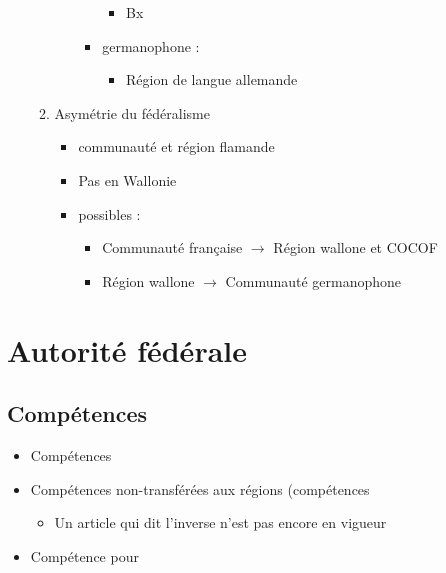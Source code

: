 \begin{itemize}
\begin{enumerate}
\begin{itemize}
\begin{itemize}
\begin{itemize}
					\item Bx
				\end{itemize}
				\item germanophone :
				\begin{itemize}
					\item Région de langue allemande
				\end{itemize}
			\end{itemize}
		\end{itemize}
		\item Asymétrie du fédéralisme
		\begin{itemize}
			\item {} communauté et région flamande
			\item Pas en Wallonie
			\item {} possibles :
			\begin{itemize}
				\item Communauté française $\rightarrow$ Région wallone et COCOF
				\item Région wallone $\rightarrow$ Communauté germanophone
			\end{itemize}
		\end{itemize}
	\end{enumerate}
\end{itemize}

\section{Autorité fédérale}

\subsection{Compétences}
\begin{itemize}
	\item Compétences 
	\item Compétences non-transférées aux régions (compétences 
	\begin{itemize}
		\item Un article qui dit l'inverse n'est pas encore en vigueur
	\end{itemize}
	\item Compétence pour 
\end{itemize}

